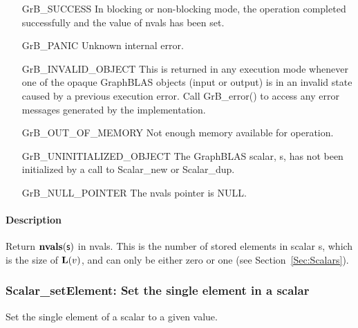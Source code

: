 \begin{itemize}[leftmargin=2.1in]
    \item[{\sf GrB\_SUCCESS}]  In blocking or non-blocking mode, the operation 
    completed successfully and the value of {\sf nvals} has been set. 

    \item[{\sf GrB\_PANIC}]    Unknown internal error.
    
    \item[{\sf GrB\_INVALID\_OBJECT}] This is returned in any execution mode 
    whenever one of the opaque GraphBLAS objects (input or output) is in an invalid 
    state caused by a previous execution error.  Call {\sf GrB\_error()} to access 
    any error messages generated by the implementation.

    \item[{\sf GrB\_OUT\_OF\_MEMORY}] Not enough memory available for operation.
    
    \item[{\sf GrB\_UNINITIALIZED\_OBJECT}]  The GraphBLAS scalar, {\sf s}, has 
    not been initialized by a call to {\sf Scalar\_new} or {\sf Scalar\_dup}.
    
    \item[{\sf GrB\_NULL\_POINTER}]  The {\sf nvals} pointer is {\sf NULL}.
\end{itemize}

\paragraph{Description}


Return $\mathbf{nvals}({\sf s})$ in {\sf nvals}. This is the number of stored 
elements in scalar {\sf s}, which is the size of $\mathbf{L}({v})$, and
can only be either zero or one (see Section~\ref{Sec:Scalars}).

\subsubsection{{\sf Scalar\_setElement}: Set the single element in a scalar}

Set the single element of a scalar to a given value.

\paragraph{\syntax}

